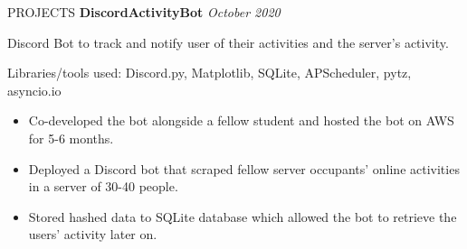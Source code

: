 \documentclass{ResumeFormat} %
\begin{document}
\begin{rSection}{PROJECTS}
\textbf{DiscordActivityBot} {} \hfill {\emph{October 2020}}

Discord Bot to track and notify user of their activities and the server’s activity.

Libraries/tools used: Discord.py, Matplotlib, SQLite, APScheduler, pytz, asyncio.io
\begin{itemize}
    \itemsep -3pt {}
     \item Co-developed the bot alongside a fellow student and hosted the bot on AWS for 5-6 months.
     \item Deployed a Discord bot that scraped fellow server occupants’ online activities in a server of 30-40 people.
     \item Stored hashed data to SQLite database which allowed the bot to retrieve the users' activity later on.
 \end{itemize}
\end{rSection} 





 
\end{document}
